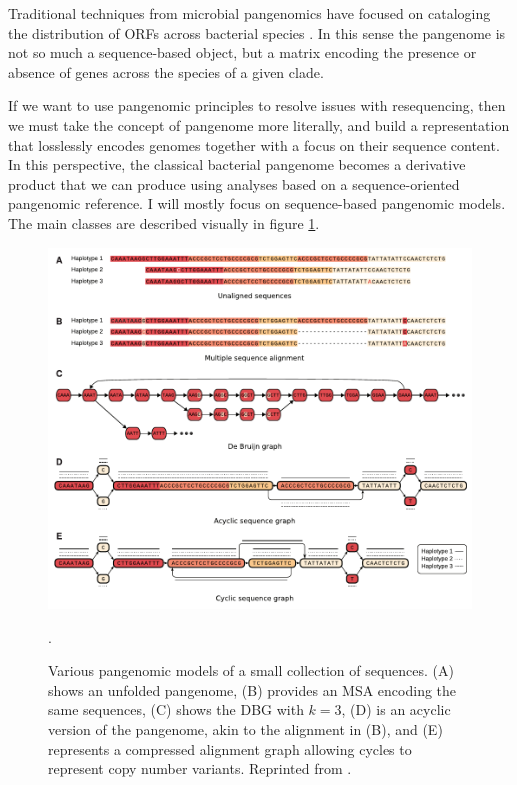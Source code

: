 Traditional techniques from microbial pangenomics have focused on cataloging the distribution of ORFs across bacterial species \cite{page2015roary}.
In this sense the pangenome is not so much a sequence-based object, but a matrix encoding the presence or absence of genes across the species of a given clade.

If we want to use pangenomic principles to resolve issues with resequencing, then we must take the concept of pangenome more literally, and build a representation that losslessly encodes genomes together with a focus on their sequence content.
In this perspective, the classical bacterial pangenome becomes a derivative product that we can produce using analyses based on a sequence-oriented pangenomic reference.
I will mostly focus on sequence-based pangenomic models.
The main classes are described visually in figure \ref{fig:pangenomic_models}.

\begin{figure}[htbp!]
  \centering
  \includegraphics[width=1.0\textwidth]{Chapter1/Figs/cpang_fig3.pdf}
  \caption[Pangenomic models]{
    Various pangenomic models of a small collection of sequences.
    (A) shows an unfolded pangenome,
    (B) provides an MSA encoding the same sequences,
    (C) shows the DBG with $k=3$,
    (D) is an acyclic version of the pangenome, akin to the alignment in (B),
    and (E) represents a compressed alignment graph allowing cycles to represent copy number variants. 
    Reprinted from \cite{computational2016computational}.
    }
  \label{fig:pangenomic_models}.
\end{figure}

